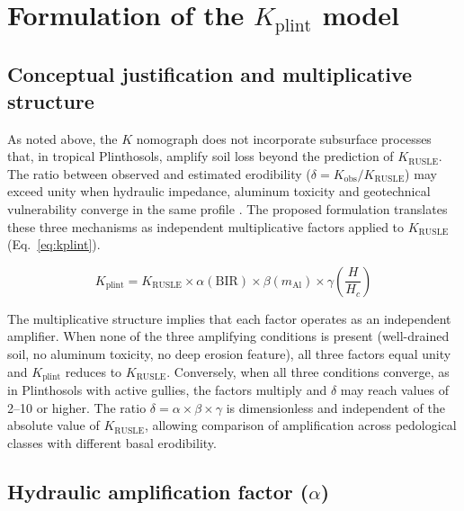 \documentclass[pdflatex,sn-basic,referee,lineno]{sn-jnl}
\begin{document}
\section{Formulation of the \texorpdfstring{$K_{\mathrm{plint}}$}{K-plint} model}
\label{sec:model}

\subsection{Conceptual justification and multiplicative structure}

As noted above, the $K$ nomograph does not incorporate subsurface processes that, in tropical Plinthosols, amplify soil loss beyond the prediction of $K_{\mathrm{RUSLE}}$. The ratio between observed and estimated erodibility ($\delta = K_{\mathrm{obs}}/K_{\mathrm{RUSLE}}$) may exceed unity when hydraulic impedance, aluminum toxicity and geotechnical vulnerability converge in the same profile \citep{poesen_2018}. The proposed formulation translates these three mechanisms as independent multiplicative factors applied to $K_{\mathrm{RUSLE}}$ (Eq.~\ref{eq:kplint}).

\begin{equation}
K_{\mathrm{plint}} = K_{\mathrm{RUSLE}} \times \alpha(\mathrm{BIR}) \times \beta(m_{\mathrm{Al}}) \times \gamma\!\left(\frac{H}{H_c}\right)
\label{eq:kplint}
\end{equation}

The multiplicative structure implies that each factor operates as an independent amplifier. When none of the three amplifying conditions is present (well-drained soil, no aluminum toxicity, no deep erosion feature), all three factors equal unity and $K_{\mathrm{plint}}$ reduces to $K_{\mathrm{RUSLE}}$. Conversely, when all three conditions converge, as in Plinthosols with active gullies, the factors multiply and $\delta$ may reach values of 2--10 or higher. The ratio $\delta = \alpha \times \beta \times \gamma$ is dimensionless and independent of the absolute value of $K_{\mathrm{RUSLE}}$, allowing comparison of amplification across pedological classes with different basal erodibility.

\subsection{Hydraulic amplification factor (\texorpdfstring{$\alpha$}{alpha})}
\end{document}

